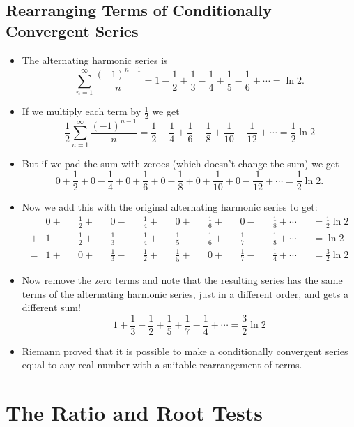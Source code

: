\documentclass[letterpaper, 11pt, openany]{book}
\theoremstyle{mytheoremstyle}
\theoremstyle{myexamplestyle}
\begin{document}
\subsection{Rearranging Terms of Conditionally Convergent Series}
\begin{itemize}
    \item The alternating harmonic series is
    \[\sum_{n=1}^{\infty} \frac{(-1)^{n-1}}{n}= 1 - \frac{1}{2} + \frac{1}{3} - \frac{1}{4} + \frac{1}{5} - \frac{1}{6} + \cdots = \ln 2.\]
    \item If we multiply each term by $\frac{1}{2}$ we get
    \[\frac{1}{2}\sum_{n=1}^{\infty} \frac{(-1)^{n-1}}{n} = \frac{1}{2} - 	\frac{1}{4} +	 \frac{1}{6} -	 \frac{1}{8} + \frac{1}{10} - \frac{1}{12} + \cdots= \frac{1}{2}\ln 2\]
    \item But if we pad the sum with zeroes (which doesn't change the sum) we get
    \[0 + \frac{1}{2} + 0 -\frac{1}{4} + 0 + \frac{1}{6} + 0 - \frac{1}{8} + 0 + \frac{1}{10} + 0 - \frac{1}{12} + \cdots = \frac{1}{2}\ln 2.\]
    \item Now we add this with the original alternating harmonic series to get:
	\begin{equation*}
		\begin{alignedat}{13}
			&0 + &&\frac{1}{2} + &&0 -				&&\frac{1}{4} + &&0 + 			&&\frac{1}{6} + &&0 - 			&&\frac{1}{8}  + \cdots &&= \frac{1}{2}\ln 2 \\
			+&1 - &&\frac{1}{2} + &&\frac{1}{3} - 	&&\frac{1}{4} + &&\frac{1}{5} - &&\frac{1}{6} + &&\frac{1}{7} - &&\frac{1}{8} + \cdots  &&= \ln 2 \\
			=&1 + &&0 + 		&&\frac{1}{3} -&&\frac{1}{2} + &&\frac{1}{5} + 		&&0 + && \frac{1}{7} - &&\frac{1}{4} + 	\cdots &&= \frac{3}{2}\ln 2
		\end{alignedat}
    \end{equation*}
    \item Now remove the zero terms and note that the resulting series has the same terms of the alternating harmonic series, just in a different order, and gets a different sum!
    \[
        1 + \frac{1}{3} -\frac{1}{2} + \frac{1}{5} + \frac{1}{7} - \frac{1}{4} + \cdots = \frac{3}{2}\ln 2
    \]
    \item Riemann proved that it is possible to make a conditionally convergent series equal to any real number with a suitable rearrangement of terms.
\end{itemize}        

\section{The Ratio and Root Tests}
\setcounter{figure}{0}
\end{document}

